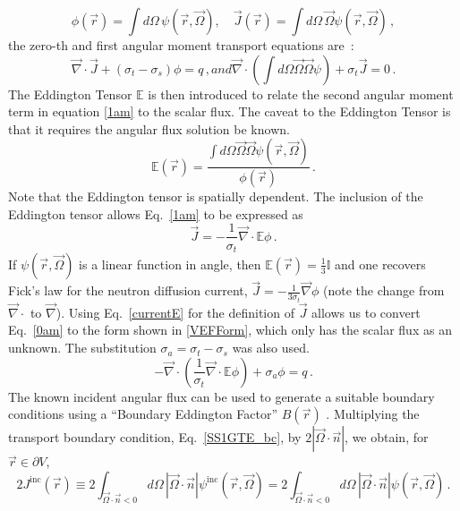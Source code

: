 \documentclass[12pt]{report}
\newcommand{\vr}{\vec{r}}
\newcommand{\vO}{\vec{\Omega}}
\renewcommand{\div}{\vec{\nabla} \cdot}
\newcommand{\grad}{\vec{\nabla}}
\newcommand{\bound}{\partial V}
\newcommand{\vn}{\vec{n}}
\newcommand{\Edd}{\mathbb{E}}
\newcommand{\BEdd}{B}
\newcommand{\sigt}{\sigma_t}
\newcommand{\sigs}{\sigma_s}
\newcommand{\siga}{\sigma_a}
\newcommand{\scalSource}{q}
\begin{document}
\begin{equation}
\label{VETFormStart}
\phi(\vr)=\int d\Omega \, \psi( \vr,\vO )
,\quad
\vec{J}(\vr)= \int d\Omega \, \vO \psi( \vr,\vO ) \,,
\end{equation}
the zero-th and first angular moment transport equations are~: 
%
\begin{subequations}
%
\begin{equation}
\label{0am}
\div \vec{J} + (\sigt-\sigs) \phi = \scalSource \,,
\end{equation}
and
\begin{equation}
\label{1am}
\div \left(  \int d\Omega \vO \vO \psi \right) + \sigt \vec{J} = 0 \,.
\end{equation}
%
\end{subequations}
The Eddington Tensor $\Edd$ is then introduced to relate the second angular moment term in equation \eqref{1am} to the scalar flux. The caveat to the Eddington Tensor is that it requires the angular flux solution be known.
\begin{equation}
\label{EddDef}
\Edd(\vr)=\frac{\int d\Omega \vO \vO \psi(\vr,\vO)}{\phi(\vr)} \,.
\end{equation}Note that the Eddington tensor is spatially dependent.
The inclusion of the Eddington tensor allows Eq.~\eqref{1am} to be expressed as 
\begin{equation}
\label{currentE}
\vec{J} = - \frac{1}{\sigt} \div \Edd \phi \,.
\end{equation}
If $\psi(\vr,\vO)$ is a linear function in angle, then $\Edd(\vr)=\tfrac{1}{3}\mathbb{I}$ and one recovers Fick's law for the neutron diffusion current, $\vec{J} = - \frac{1}{3\sigt} \grad \phi$ (note the change from $\div$ to $\grad$). Using Eq.~\eqref{currentE} for the definition of $\vec{J}$ allows us to convert Eq.~\eqref{0am} to the form shown in \eqref{VEFForm}, which only has the scalar flux as an unknown. The substitution $\siga = \sigt-\sigs$ was also used.
\begin{equation}
\label{VEFForm}
- \div \left( \frac{1}{\sigt}\div \Edd \phi \right) + \siga \phi = \scalSource \,.
\end{equation}
The known incident angular flux can be used to generate a suitable boundary conditions using a 
``Boundary Eddington Factor'' $\BEdd(\vr)$ \cite{Miften}. Multiplying the transport boundary condition,
Eq.~\eqref{SS1GTE_bc}, by $2 | \vO \cdot \vn |$, we obtain, for $\vr \in \bound$,
\begin{equation}
2 J^{\text{inc}}(\vr) \equiv  2 \int_{\vO \cdot \vn <0 }  d \Omega\, | \vO \cdot \vec{n} | \psi^{\text{inc}}(\vr,\vO) 
= 2\int_{\vO \cdot \vn <0 } d \Omega\,  | \vO \cdot \vn |  \psi(\vr,\vO) \,.
\end{equation}
\end{document}
